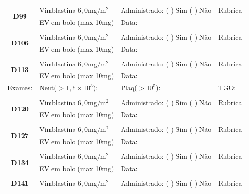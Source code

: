 \documentclass[11pt,a4paper,oldfontcommands]{memoir}
\def\entrywithlabel[#1]#2{\parbox{#1}{{\small #2:} \hrulefill}}
\begin{document}
\begin{center}
\noindent{
\entrywithlabel[1\hsize]{\textbf{Nome}}\hfill
\\[0.3cm]
\entrywithlabel[.45\hsize]{\textbf{Peso}}\hfill  \entrywithlabel[.45\hsize]{\textbf{Estatura}}
}

\begin{table}[H]
\begin{tabular}{p{}p{}|p{}|p{3cm}}
    \hline
    \multicolumn{1}{c|}{\multirow{2}{*}{\textbf{D99}}}&{Vimblastina \(6,0\)mg/m\(^2\)}&{Administrado: (  ) Sim (  ) Não}&{Rubrica}\\
    \multicolumn{1}{c|}{}&{EV em bolo (max 10mg)}&{Data:}&\\
    \hline
    \\
    \hline
    \multicolumn{1}{c|}{\multirow{2}{*}{\textbf{D106}}}&{Vimblastina \(6,0\)mg/m\(^2\)}&{Administrado: (  ) Sim (  ) Não}&{Rubrica}\\
    \multicolumn{1}{c|}{}&{EV em bolo (max 10mg)}&{Data:}&\\
    \hline
    \\
    \hline
    \multicolumn{1}{c|}{\multirow{2}{*}{\textbf{D113}}}&{Vimblastina \(6,0\)mg/m\(^2\)}&{Administrado: (  ) Sim (  ) Não}&{Rubrica}\\
    \multicolumn{1}{c|}{}&{EV em bolo (max 10mg)}&{Data:}&\\
    \hline
    {Exames:}&{Neut(\(>1,5\times10^3\)):}&{Plaq(\(>10^5\)):}&{TGO:}
    \\
    \hline
    \\
    \hline
    \multicolumn{1}{c|}{\multirow{2}{*}{\textbf{D120}}}&{Vimblastina \(6,0\)mg/m\(^2\)}&{Administrado: (  ) Sim (  ) Não}&{Rubrica}\\
    \multicolumn{1}{c|}{}&{EV em bolo (max 10mg)}&{Data:}&\\
    \hline\\
    \hline
    \multicolumn{1}{c|}{\multirow{2}{*}{\textbf{D127}}}&{Vimblastina \(6,0\)mg/m\(^2\)}&{Administrado: (  ) Sim (  ) Não}&{Rubrica}\\
    \multicolumn{1}{c|}{}&{EV em bolo (max 10mg)}&{Data:}&\\
    \hline
    \\
    \hline
    \multicolumn{1}{c|}{\multirow{2}{*}{\textbf{D134}}}&{Vimblastina \(6,0\)mg/m\(^2\)}&{Administrado: (  ) Sim (  ) Não}&{Rubrica}\\
    \multicolumn{1}{c|}{}&{EV em bolo (max 10mg)}&{Data:}&\\
    \hline
    \\
    \hline
    \multicolumn{1}{c|}{\multirow{2}{*}{\textbf{D141}}}&{Vimblastina \(6,0\)mg/m\(^2\)}&{Administrado: (  ) Sim (  ) Não}&{Rubrica}\\

\end{tabular}
\end{table}
\end{center}
\end{document}

